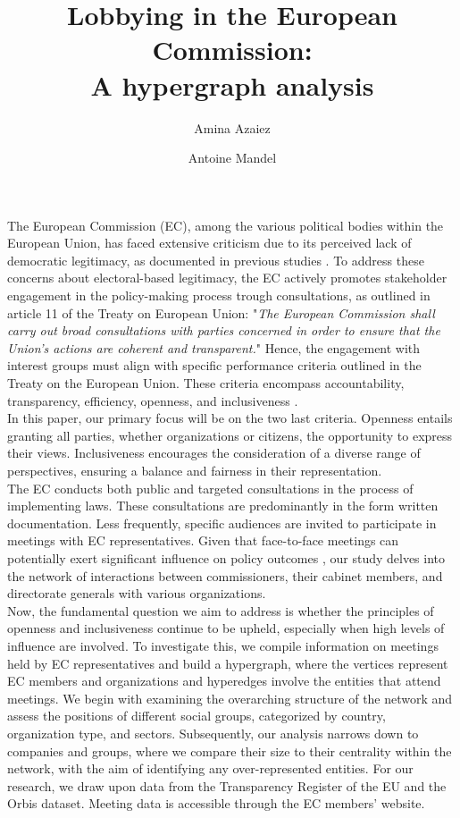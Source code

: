 \documentclass[ 11pt]{article}
\author[1]{Amina Azaiez}
\author[1]{Antoine Mandel}
\affil[1]{Université Paris 1 Panthéon-Sorbonne, Centre
d’économie de la Sorbonne, Maison des sciences économiques}
\title{Lobbying in the European Commission:\\ A hypergraph analysis }
\date{}
\begin{document}
\maketitle


The European Commission (EC), among the various political bodies within the European Union, has faced extensive criticism due to its perceived lack of democratic legitimacy, as documented in previous studies  \parencite{schmidt_europes_2020,thomas_democratic_2009}.
To address these concerns about electoral-based legitimacy, the EC actively promotes stakeholder engagement in the policy-making process trough consultations, as outlined in article 11 of the Treaty on European Union:  "\textit{The European Commission shall carry out broad consultations with parties concerned in order to ensure that the Union's actions are coherent and transparent.}"
Hence, the engagement with interest groups must align with specific performance criteria outlined in the Treaty on the European Union. These criteria encompass accountability, transparency, efficiency, openness, and inclusiveness \parencite{schmidt_europes_2020}. \\
In this paper, our primary focus will be on the two last criteria. Openness entails granting all parties, whether organizations or citizens, the opportunity to express their views. 
Inclusiveness encourages the consideration of a diverse range of perspectives, ensuring a balance and fairness in their representation. \\

The EC conducts both public and targeted consultations in the process of implementing laws.
These consultations are predominantly in the form written documentation. Less frequently, specific audiences are invited to participate in meetings with EC representatives. 
Given that face-to-face meetings can potentially exert significant influence on policy outcomes \parencite{heinz_hollow_1997,noah_efriedkin_social_1998,zeng_multiplex_2016,pappi_organization_1999}, our study delves into the network of interactions between commissioners, their cabinet members, and directorate generals with various organizations.\\
Now, the fundamental question we aim to address is whether the principles of openness and inclusiveness continue to be upheld, especially when high levels of influence are involved. 
To investigate this, we compile information on meetings held by EC representatives and build a hypergraph, where the vertices represent EC members and organizations and hyperedges involve the entities that attend meetings.  
We begin with examining the overarching structure of the network and assess the positions of different social groups, categorized by country, organization type, and sectors.
Subsequently, our analysis narrows down to companies and groups, where we compare their size to their centrality within the network, with the aim of identifying any over-represented entities. 
For our research, we draw upon data from the Transparency Register of the EU and the Orbis dataset. Meeting data is accessible through the EC members' website. \\
\end{document}
